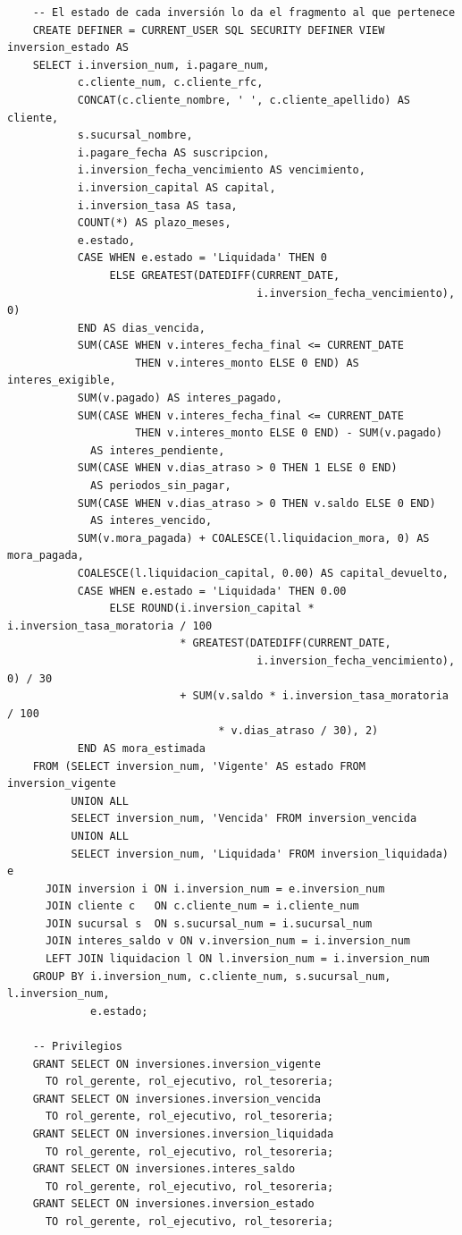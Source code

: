 \begin{verbatim}
	-- El estado de cada inversión lo da el fragmento al que pertenece
	CREATE DEFINER = CURRENT_USER SQL SECURITY DEFINER VIEW inversion_estado AS
	SELECT i.inversion_num, i.pagare_num,
	       c.cliente_num, c.cliente_rfc,
	       CONCAT(c.cliente_nombre, ' ', c.cliente_apellido) AS cliente,
	       s.sucursal_nombre,
	       i.pagare_fecha AS suscripcion,
	       i.inversion_fecha_vencimiento AS vencimiento,
	       i.inversion_capital AS capital,
	       i.inversion_tasa AS tasa,
	       COUNT(*) AS plazo_meses,
	       e.estado,
	       CASE WHEN e.estado = 'Liquidada' THEN 0
	            ELSE GREATEST(DATEDIFF(CURRENT_DATE,
	                                   i.inversion_fecha_vencimiento), 0)
	       END AS dias_vencida,
	       SUM(CASE WHEN v.interes_fecha_final <= CURRENT_DATE
	                THEN v.interes_monto ELSE 0 END) AS interes_exigible,
	       SUM(v.pagado) AS interes_pagado,
	       SUM(CASE WHEN v.interes_fecha_final <= CURRENT_DATE
	                THEN v.interes_monto ELSE 0 END) - SUM(v.pagado)
	         AS interes_pendiente,
	       SUM(CASE WHEN v.dias_atraso > 0 THEN 1 ELSE 0 END)
	         AS periodos_sin_pagar,
	       SUM(CASE WHEN v.dias_atraso > 0 THEN v.saldo ELSE 0 END)
	         AS interes_vencido,
	       SUM(v.mora_pagada) + COALESCE(l.liquidacion_mora, 0) AS mora_pagada,
	       COALESCE(l.liquidacion_capital, 0.00) AS capital_devuelto,
	       CASE WHEN e.estado = 'Liquidada' THEN 0.00
	            ELSE ROUND(i.inversion_capital * i.inversion_tasa_moratoria / 100
	                       * GREATEST(DATEDIFF(CURRENT_DATE,
	                                   i.inversion_fecha_vencimiento), 0) / 30
	                       + SUM(v.saldo * i.inversion_tasa_moratoria / 100
	                             * v.dias_atraso / 30), 2)
	       END AS mora_estimada
	FROM (SELECT inversion_num, 'Vigente' AS estado FROM inversion_vigente
	      UNION ALL
	      SELECT inversion_num, 'Vencida' FROM inversion_vencida
	      UNION ALL
	      SELECT inversion_num, 'Liquidada' FROM inversion_liquidada) e
	  JOIN inversion i ON i.inversion_num = e.inversion_num
	  JOIN cliente c   ON c.cliente_num = i.cliente_num
	  JOIN sucursal s  ON s.sucursal_num = i.sucursal_num
	  JOIN interes_saldo v ON v.inversion_num = i.inversion_num
	  LEFT JOIN liquidacion l ON l.inversion_num = i.inversion_num
	GROUP BY i.inversion_num, c.cliente_num, s.sucursal_num, l.inversion_num,
	         e.estado;

	-- Privilegios
	GRANT SELECT ON inversiones.inversion_vigente
	  TO rol_gerente, rol_ejecutivo, rol_tesoreria;
	GRANT SELECT ON inversiones.inversion_vencida
	  TO rol_gerente, rol_ejecutivo, rol_tesoreria;
	GRANT SELECT ON inversiones.inversion_liquidada
	  TO rol_gerente, rol_ejecutivo, rol_tesoreria;
	GRANT SELECT ON inversiones.interes_saldo
	  TO rol_gerente, rol_ejecutivo, rol_tesoreria;
	GRANT SELECT ON inversiones.inversion_estado
	  TO rol_gerente, rol_ejecutivo, rol_tesoreria;
\end{verbatim}

